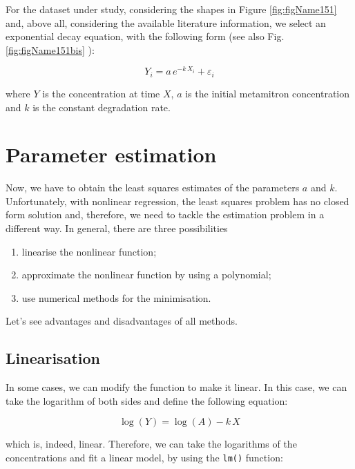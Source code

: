 \documentclass[a4paper,12pt,oneside]{book}
\providecommand{\tightlist}{%
  \setlength{\itemsep}{0pt}\setlength{\parskip}{0pt}}
\begin{document}
For the dataset under study, considering the shapes in Figure \ref{fig:figName151} and, above all, considering the available literature information, we select an exponential decay equation, with the following form (see also Fig. \ref{fig:figName151bis} ):

\[Y_i = a \, e^{-k \,X_i} + \varepsilon_i\]

where \(Y\) is the concentration at time \(X\), \(a\) is the initial metamitron concentration and \(k\) is the constant degradation rate.

\hypertarget{parameter-estimation-3}{%
\section{Parameter estimation}\label{parameter-estimation-3}}

Now, we have to obtain the least squares estimates of the parameters \(a\) and \(k\). Unfortunately, with nonlinear regression, the least squares problem has no closed form solution and, therefore, we need to tackle the estimation problem in a different way. In general, there are three possibilities

\begin{enumerate}
\def\labelenumi{\arabic{enumi}.}
\tightlist
\item
  linearise the nonlinear function;
\item
  approximate the nonlinear function by using a polynomial;
\item
  use numerical methods for the minimisation.
\end{enumerate}

Let's see advantages and disadvantages of all methods.

\hypertarget{linearisation}{%
\subsection{Linearisation}\label{linearisation}}

In some cases, we can modify the function to make it linear. In this case, we can take the logarithm of both sides and define the following equation:

\[ \log(Y) = \log(A) - k \, X \]

which is, indeed, linear. Therefore, we can take the logarithms of the concentrations and fit a linear model, by using the \texttt{lm()} function:

\vspace{12pt}
\end{document}
